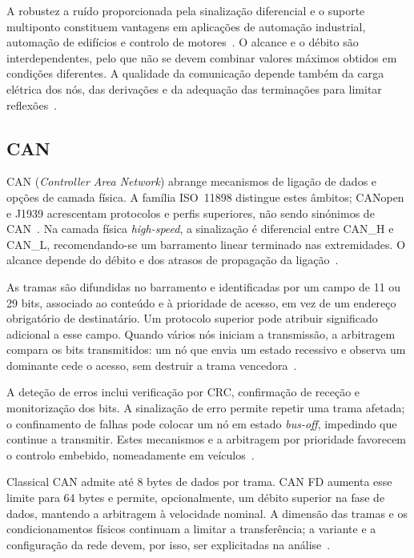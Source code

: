 A robustez a ruído proporcionada pela sinalização diferencial e o suporte
multiponto constituem vantagens em aplicações de automação industrial,
automação de edifícios e controlo de motores~\cite{stiller_rs485_2015}.
O alcance e o débito são interdependentes, pelo que não se devem combinar
valores máximos obtidos em condições diferentes. A qualidade da comunicação
depende também da carga elétrica dos nós, das derivações e da adequação
das terminações para limitar reflexões~\cite[secs.~2 e~5--7]{ti_rs485_an1057_2013}.

\subsection{CAN}

CAN (\textit{Controller Area Network}) abrange mecanismos de ligação de
dados e opções de camada física. A família ISO~11898 distingue estes
âmbitos; CANopen e J1939 acrescentam protocolos e perfis superiores,
não sendo sinónimos de CAN~\cite{cia_can_standardization}.
Na camada física \textit{high-speed}, a sinalização é diferencial entre
CAN\_H e CAN\_L, recomendando-se um barramento linear terminado nas
extremidades. O alcance depende do débito e dos atrasos de propagação
da ligação~\cite{cia_can_hs}.

As tramas são difundidas no barramento e identificadas por um campo de
11 ou 29 bits, associado ao conteúdo e à prioridade de acesso, em vez
de um endereço obrigatório de destinatário. Um protocolo superior pode
atribuir significado adicional a esse campo. Quando vários nós iniciam
a transmissão, a arbitragem compara os bits transmitidos: um nó que
envia um estado recessivo e observa um dominante cede o acesso, sem
destruir a trama vencedora~\cite{cia_can_cc}.

A deteção de erros inclui verificação por CRC, confirmação de receção
e monitorização dos bits. A sinalização de erro permite repetir uma
trama afetada; o confinamento de falhas pode colocar um nó em estado
\textit{bus-off}, impedindo que continue a transmitir. Estes mecanismos
e a arbitragem por prioridade favorecem o controlo embebido,
nomeadamente em veículos~\cite{cia_can_cc}.

Classical CAN admite até 8 bytes de dados por trama. CAN FD aumenta
esse limite para 64 bytes e permite, opcionalmente, um débito superior
na fase de dados, mantendo a arbitragem à velocidade nominal.
A dimensão das tramas e os condicionamentos físicos continuam a limitar
a transferência; a variante e a configuração da rede devem, por isso,
ser explicitadas na análise~\cite{cia_can_fd,cia_can_hs}.

